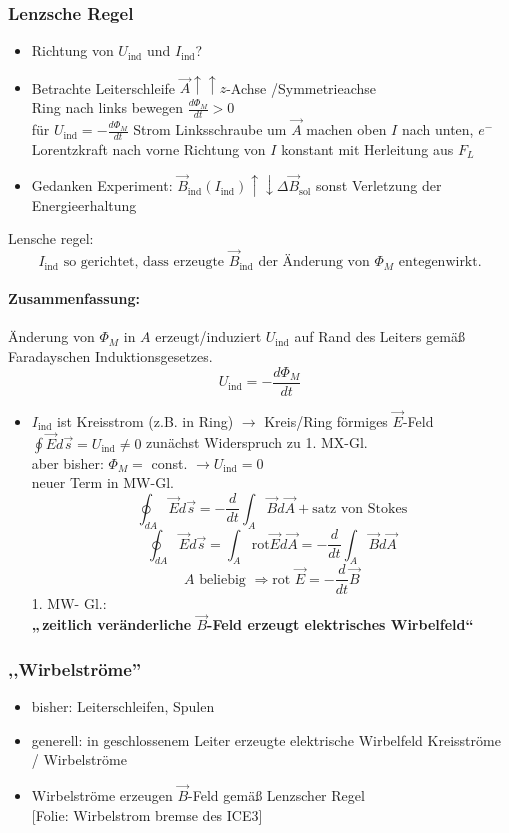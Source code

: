 \documentclass[titlepage,12pt,a4paper,ngerman]{report}
\newcommand{\tx}[1]{\textrm{#1}}
\newcommand{\uind}{U_{\tx{ind}}}
\newcommand{\folie}[1]{\color{gray}[Folie: #1]\color{black}}
\begin{document}
\subsubsection{Lenzsche Regel}
\begin{itemize}
	\item Richtung von $\uind$ und $I_{\tx{ind}}$?
	\item Betrachte Leiterschleife $\vec{A} \uparrow \uparrow z$-Achse /Symmetrieachse\\
	Ring nach links bewegen $\frac{d\Phi_M}{dt}>0$\\
	für $\uind = - \frac{d\Phi_M}{dt}$ Strom Linksschraube um $\vec{A}$ machen oben $I$ nach unten, $e^-$ Lorentzkraft nach vorne Richtung von $I$ konstant mit Herleitung aus $F_L$
	\item Gedanken Experiment: $\vec{B}_{\tx{ind}}(I_{\tx{ind}}) \uparrow \downarrow \Delta \vec{B}_{\tx{sol}}$ sonst Verletzung der Energieerhaltung
\end{itemize}
Lensche regel:
$$\boxed{I_{\tx{ind}} \tx{ so gerichtet, dass erzeugte }\vec{B}_{\tx{ind}}\tx{ der Änderung von }\Phi_M \tx{ entegenwirkt.}}$$

\paragraph{Zusammenfassung:}
Änderung von $\Phi_M$ in $A$ erzeugt/induziert $\uind$ auf Rand des Leiters gemäß Faradayschen Induktionsgesetzes.
$$\boxed{\uind= -\frac{d \Phi_M}{dt}}$$
\begin{itemize}
	\item $I_{\tx{ind}}$ ist Kreisstrom (z.B. in Ring)
	$\rightarrow$ Kreis/Ring förmiges $\vec{E}$-Feld\\
	$\oint \vec{E}d \vec{s} = \uind \neq 0$ zunächst Widerspruch zu 1. MX-Gl.\\
	aber bisher: $\Phi_M = $ const. $\rightarrow \uind =0$\\
	neuer Term in MW-Gl.
	$$\boxed{\oint_{dA} \vec{E}d \vec{s} = - \frac{d}{dt}\int_A \vec{B} d \vec{A} + \tx{satz von Stokes}}$$
	$$\oint_{dA} \vec{E}d \vec{s} = \int_A \tx{rot} \vec{E}d \vec{A} = - \frac{d}{dt}\int_A \vec{B}d \vec{A}$$
	$$A \tx{ beliebig } \Rightarrow \boxed{\tx{rot } \vec{E}= -\frac{d}{dt}\vec{B}}$$
	1. MW- Gl.:\\
	\textbf{„$ \, $zeitlich veränderliche $\vec{B}$-Feld erzeugt elektrisches Wirbelfeld“}
\end{itemize}
\subsubsection{,,Wirbelströme''}
\begin{itemize}
	\item bisher: Leiterschleifen, Spulen
	\item generell: in geschlossenem Leiter erzeugte elektrische Wirbelfeld Kreisströme / Wirbelströme
	\item Wirbelströme erzeugen $\vec{B}$-Feld gemäß Lenzscher Regel\\
	\folie{Wirbelstrom bremse des ICE3}
\end{itemize}
\end{document}
